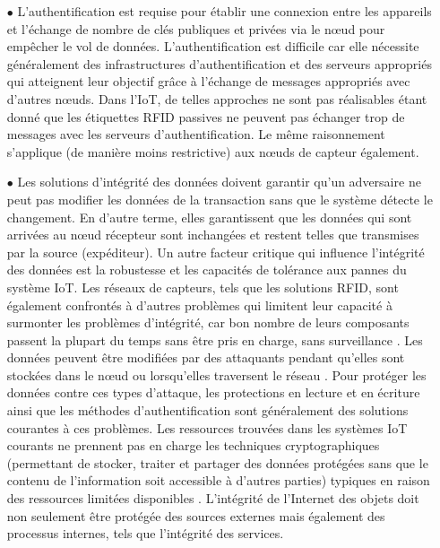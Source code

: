 	\begin{itemize}
		\item[$\bullet$] L'authentif{\kern0pt}ication est requise pour établir une connexion entre les appareils et l'échange de nombre de clés publiques et privées via le nœud pour empêcher le vol de données. L'authentif{\kern0pt}ication est dif{\kern0pt}f{\kern0pt}icile car elle nécessite généralement des infrastructures d'authentif{\kern0pt}ication et des serveurs appropriés qui atteignent leur objectif grâce à l'échange de messages appropriés avec d'autres nœuds. Dans l'IoT, de telles approches ne sont pas réalisables étant donné que les étiquettes RFID passives ne peuvent pas échanger trop de messages avec les serveurs d'authentif{\kern0pt}ication. Le même raisonnement s'applique (de manière moins restrictive) aux nœuds de capteur également.\\
		
		\item[$\bullet$] Les solutions d'intégrité des données doivent garantir qu'un adversaire ne peut pas modif{\kern0pt}ier les données de la transaction sans que le système détecte le changement. En d’autre terme, elles garantissent que les données qui sont arrivées au nœud récepteur sont inchangées et restent telles que transmises par la source (expéditeur). Un autre facteur critique qui influence l'intégrité des données est la robustesse et les capacités de tolérance aux pannes du système IoT. Les réseaux de capteurs, tels que les solutions RFID, sont également confrontés à d'autres problèmes qui limitent leur capacité à surmonter les problèmes d'intégrité, car bon nombre de leurs composants passent la plupart du temps sans être pris en charge, sans surveillance \cite{musonda2018iot}. Les données peuvent être modif{\kern0pt}iées par des attaquants pendant qu'elles sont stockées dans le nœud ou lorsqu'elles traversent le réseau \cite{karygiannis2007guidelines}. Pour protéger les données contre ces types d'attaque, les protections en lecture et en écriture ainsi que les méthodes d'authentif{\kern0pt}ication sont généralement des solutions courantes à ces problèmes. Les ressources trouvées dans les systèmes IoT courants ne prennent pas en charge les techniques cryptographiques (permettant de stocker, traiter et partager des données protégées sans que le contenu de l'information soit accessible à d'autres parties) typiques en raison des ressources limitées disponibles \cite{musonda2018iot}. L'intégrité de l'Internet des objets doit non seulement être protégée des sources externes mais également des processus internes, tels que l'intégrité des services.
	\end{itemize}


